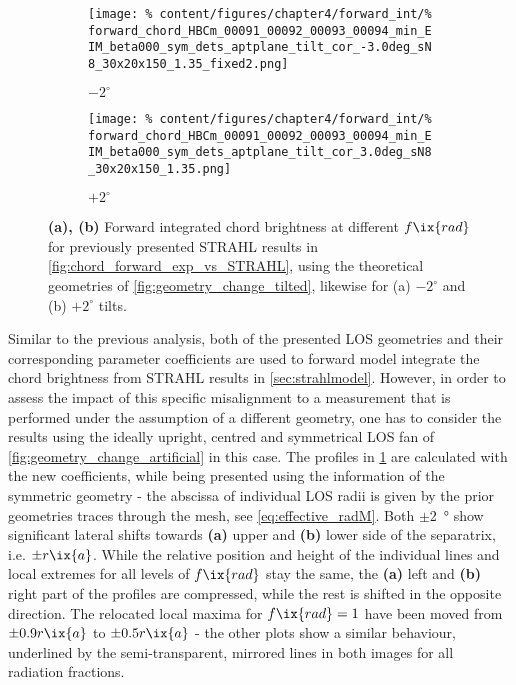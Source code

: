 %
            \begin{figure}[t]%
                \centering%
                \begin{subfigure}{0.47\textwidth}%
                    \texttt{[image: \%
                        content/figures/chapter4/forward\_int/\%
                        forward\_chord\_HBCm\_00091\_00092\_00093\_00094\_min\_EIM\_beta000\_sym\_dets\_aptplane\_tilt\_cor\_-3.0deg\_sN8\_30x20x150\_1.35\_fixed2.png]}%
                    \caption{$-2^{\circ}$}%
                \end{subfigure}%
                \hfill%
                \begin{subfigure}{0.47\textwidth}%
                    \texttt{[image: \%
                        content/figures/chapter4/forward\_int/\%
                        forward\_chord\_HBCm\_00091\_00092\_00093\_00094\_min\_EIM\_beta000\_sym\_dets\_aptplane\_tilt\_cor\_3.0deg\_sN8\_30x20x150\_1.35.png]}%
                    \caption{$+2^{\circ}$}%
                \end{subfigure}%
                \caption{\textbf{(a), (b)} Forward integrated chord brightness at different $f\ix{rad}$ for previously presented STRAHL results in \cref{fig:chord_forward_exp_vs_STRAHL}, using the theoretical geometries of \cref{fig:geometry_change_tilted}, likewise for (a) $-2^{\circ}$ and (b) $+2^{\circ}$ tilts.}\label{fig:chord_change_tilted}%
            \end{figure}%
%
            Similar to the previous analysis, both of the presented LOS geometries and their corresponding parameter coefficients are used to forward model integrate the chord brightness from STRAHL results in \cref{sec:strahlmodel}. However, in order to assess the impact of this specific misalignment to a measurement that is performed under the assumption of a different geometry, one has to consider the results using the ideally upright, centred and symmetrical LOS fan of \cref{fig:geometry_change_artificial} in this case. The profiles in \cref{fig:chord_change_tilted} are calculated with the new coefficients, while being presented using the information of the symmetric geometry - the abscissa of individual LOS radii is given by the prior geometries traces through the mesh, see \cref{eq:effective_radM}. Both $\pm$\SI{2}{\degree} show significant lateral shifts towards \textbf{(a)} upper and \textbf{(b)} lower side of the separatrix, i.e. $\pm r\ix{a}$. While the relative position and height of the individual lines and local extremes for all levels of $f\ix{rad}$ stay the same, the \textbf{(a)} left and \textbf{(b)} right part of the profiles are compressed, while the rest is shifted in the opposite direction. The relocated local maxima for $f\ix{rad}=1$ have been moved from $\pm0.9r\ix{a}$ to $\pm0.5r\ix{a}$ - the other plots show a similar behaviour, underlined by the semi-transparent, mirrored lines in both images for all radiation fractions.\\%
